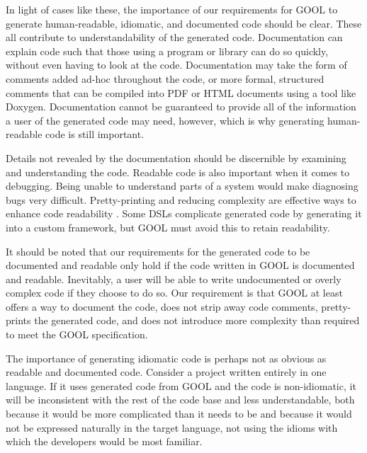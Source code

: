 \documentclass[sigplan,review,anonymous]{acmart}
\begin{document}
In light of cases like these, the importance of our requirements for GOOL to 
generate human-readable, idiomatic, and documented code should be clear. These 
all contribute to understandability of the generated code. Documentation can 
explain code such that those using a program or library can do so quickly, 
without even having to look at the code. Documentation may take the form of 
comments added ad-hoc throughout the code, or more formal, structured comments 
that can be compiled into PDF or HTML documents using a tool like Doxygen. 
Documentation cannot be guaranteed to provide all of the information a user of 
the generated code may need, however, which is why generating human-readable 
code is still important. 

Details not revealed by the documentation should be 
discernible by examining and understanding the code. Readable code is also 
important when it comes to debugging. Being unable to understand parts of a 
system would make diagnosing bugs very difficult. Pretty-printing and reducing 
complexity are effective ways to enhance code readability 
\cite{buse2009learning}. Some DSLs complicate generated code by generating it 
into a custom framework, but GOOL must avoid this to retain readability. 

It should be noted that our requirements for the generated code to be 
documented and readable only hold if the code written in GOOL is documented and 
readable. Inevitably, a user will be able to write undocumented or overly 
complex code if they choose to do so. Our requirement is that GOOL at least 
offers a way to document the code, does not strip away code comments, 
pretty-prints the generated code, and does not introduce more complexity than 
required to meet the GOOL specification.

The importance of generating idiomatic code is perhaps not as obvious as 
readable and documented code. Consider a project written entirely in one 
language. If it uses generated code from GOOL and the code is non-idiomatic, it 
will be inconsistent with the rest of the code base and less understandable, 
both because it would be more complicated than it needs to be and because it 
would not be expressed naturally in the target language, not using the idioms 
with which the developers would be most familiar.
\end{document}
